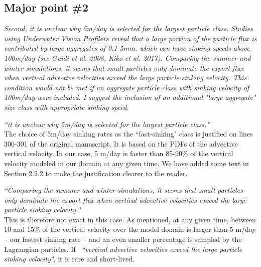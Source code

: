 \documentclass[12pt,letter]{article}
\begin{document}
\subsection*{Major point \#2}
\textit{Second, it is unclear why 5m/day is selected for the largest particle class. Studies using Underwater Vision Profilers reveal that a large portion of the particle flux is contributed by large aggregates of 0.1-5mm, which can have sinking speeds above 100m/day (see Guidi et al. 2008, Kiko et al. 2017). Comparing the summer and winter simulations, it seems that small particles only dominate the export flux when vertical advective velocities exceed the large particle sinking velocity. This condition would not be met if an aggregate particle class with sinking velocity of 100m/day were included. I suggest the inclusion of an additional "large aggregate" size class with appropriate sinking speed.\\}

\textit{``it is unclear why 5m/day is selected for the largest particle class."\\}
{\color{blue}
	The choice of 5m/day sinking rates as the ``fast-sinking"  class is justified on lines 300-301 of the original manuscript. It is based on the PDFs of the advective vertical velocity. In our case, 5 m/day is faster than 85-90\% of the vertical velocity modeled in our domain at any given time. We have added some text in Section 2.2.2 to make the justification clearer to the reader.\\}

\textit{``Comparing the summer and winter simulations, it seems that small particles only dominate the export flux when vertical advective velocities exceed the large particle sinking velocity."\\}
{\color{blue}
	This is therefore not exact in this case. As mentioned, at any given time, between 10 and 15\% of the vertical velocity over the model domain is larger than 5 m/day -- our fastest sinking rate -- and an even smaller percentage is sampled by the Lagrangian particles. If  }\textit{``vertical advective velocities exceed the large particle sinking velocity"}{\color{blue}, it is rare and short-lived.\\}
\end{document}
